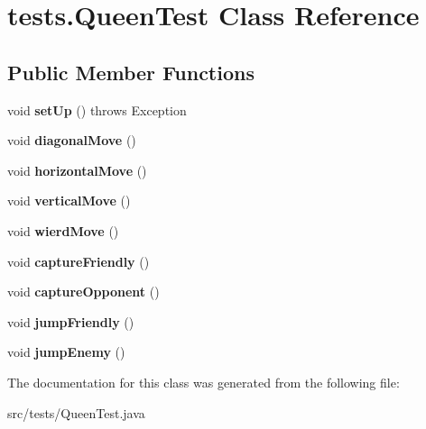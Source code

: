 \hypertarget{classtests_1_1_queen_test}{\section{tests.\-Queen\-Test Class Reference}
\label{classtests_1_1_queen_test}
}
\subsection*{Public Member Functions}
\begin{DoxyCompactItemize}
\item 
\hypertarget{classtests_1_1_queen_test_a30352da68ac5e93587ad3d736998580c}{void {\bfseries set\-Up} ()  throws Exception }\label{classtests_1_1_queen_test_a30352da68ac5e93587ad3d736998580c}

\item 
\hypertarget{classtests_1_1_queen_test_a7e7e6d21e68c95ff16276a44b6c5383a}{void {\bfseries diagonal\-Move} ()}\label{classtests_1_1_queen_test_a7e7e6d21e68c95ff16276a44b6c5383a}

\item 
\hypertarget{classtests_1_1_queen_test_a820a919578dd44015dc6824c3809a2a0}{void {\bfseries horizontal\-Move} ()}\label{classtests_1_1_queen_test_a820a919578dd44015dc6824c3809a2a0}

\item 
\hypertarget{classtests_1_1_queen_test_ad5f5f69bf7b74c24488de4611f713b4c}{void {\bfseries vertical\-Move} ()}\label{classtests_1_1_queen_test_ad5f5f69bf7b74c24488de4611f713b4c}

\item 
\hypertarget{classtests_1_1_queen_test_aa6b17aa69ff31bc43b32aef6dc05acdf}{void {\bfseries wierd\-Move} ()}\label{classtests_1_1_queen_test_aa6b17aa69ff31bc43b32aef6dc05acdf}

\item 
\hypertarget{classtests_1_1_queen_test_a54bec46acf0e55a96af113648c58de48}{void {\bfseries capture\-Friendly} ()}\label{classtests_1_1_queen_test_a54bec46acf0e55a96af113648c58de48}

\item 
\hypertarget{classtests_1_1_queen_test_a48db6b3c45130e60612168f9f53ad7dd}{void {\bfseries capture\-Opponent} ()}\label{classtests_1_1_queen_test_a48db6b3c45130e60612168f9f53ad7dd}

\item 
\hypertarget{classtests_1_1_queen_test_a810beb7310b8db5fb539fffd208d2897}{void {\bfseries jump\-Friendly} ()}\label{classtests_1_1_queen_test_a810beb7310b8db5fb539fffd208d2897}

\item 
\hypertarget{classtests_1_1_queen_test_aa5ea3fb58576c5e42323afef4b7027c4}{void {\bfseries jump\-Enemy} ()}\label{classtests_1_1_queen_test_aa5ea3fb58576c5e42323afef4b7027c4}

\end{DoxyCompactItemize}


The documentation for this class was generated from the following file\-:\begin{DoxyCompactItemize}
\item 
src/tests/Queen\-Test.\-java\end{DoxyCompactItemize}
